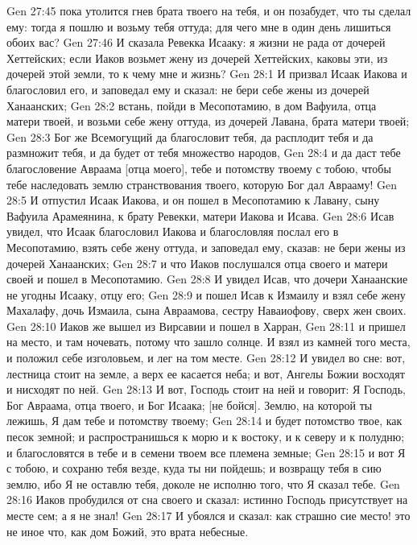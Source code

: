 \vs Gen 27:45 пока утолится гнев брата твоего на тебя, и он позабудет, что ты сделал ему: тогда я пошлю и возьму тебя оттуда; для чего мне в один день лишиться обоих вас?
\vs Gen 27:46 И сказала Ревекка Исааку: я жизни не рада от дочерей Хеттейских; если Иаков возьмет жену из дочерей Хеттейских, каковы эти, из дочерей этой земли, то к чему мне и жизнь?
\vs Gen 28:1 И призвал Исаак Иакова и благословил его, и заповедал ему и сказал: не бери себе жены из дочерей Ханаанских;
\vs Gen 28:2 встань, пойди в Месопотамию, в дом Вафуила, отца матери твоей, и возьми себе жену оттуда, из дочерей Лавана, брата матери твоей;
\vs Gen 28:3 Бог же Всемогущий да благословит тебя, да расплодит тебя и да размножит тебя, и да будет от тебя множество народов,
\vs Gen 28:4 и да даст тебе благословение Авраама [отца моего], тебе и потомству твоему с тобою, чтобы тебе наследовать землю странствования твоего, которую Бог дал Аврааму!
\vs Gen 28:5 И отпустил Исаак Иакова, и он пошел в Месопотамию к Лавану, сыну Вафуила Арамеянина, к брату Ревекки, матери Иакова и Исава.
\rsbpar\vs Gen 28:6 Исав увидел, что Исаак благословил Иакова и благословляя послал его в Месопотамию, взять себе жену оттуда, и заповедал ему, сказав: не бери жены из дочерей Ханаанских;
\vs Gen 28:7 и что Иаков послушался отца своего и матери своей и пошел в Месопотамию.
\vs Gen 28:8 И увидел Исав, что дочери Ханаанские не угодны Исааку, отцу его;
\vs Gen 28:9 и пошел Исав к Измаилу и взял себе жену Махалафу, дочь Измаила, сына Авраамова, сестру Наваиофову, сверх  жен своих.
\rsbpar\vs Gen 28:10 Иаков же вышел из Вирсавии и пошел в Харран,
\vs Gen 28:11 и пришел на  место, и  там ночевать, потому что зашло солнце. И взял  из камней того места, и положил себе изголовьем, и лег на том месте.
\vs Gen 28:12 И увидел во сне: вот, лестница стоит на земле, а верх ее касается неба; и вот, Ангелы Божии восходят и нисходят по ней.
\vs Gen 28:13 И вот, Господь стоит на ней и говорит: Я Господь, Бог Авраама, отца твоего, и Бог Исаака; [не бойся]. Землю, на которой ты лежишь, Я дам тебе и потомству твоему;
\vs Gen 28:14 и будет потомство твое, как песок земной; и распространишься к морю и к востоку, и к северу и к полудню; и благословятся в тебе и в семени твоем все племена земные;
\vs Gen 28:15 и вот Я с тобою, и сохраню тебя везде, куда ты ни пойдешь; и возвращу тебя в сию землю, ибо Я не оставлю тебя, доколе не исполню того, что Я сказал тебе.
\vs Gen 28:16 Иаков пробудился от сна своего и сказал: истинно Господь присутствует на месте сем; а я не знал!
\vs Gen 28:17 И убоялся и сказал: как страшно сие место! это не иное что, как дом Божий, это врата небесные.
